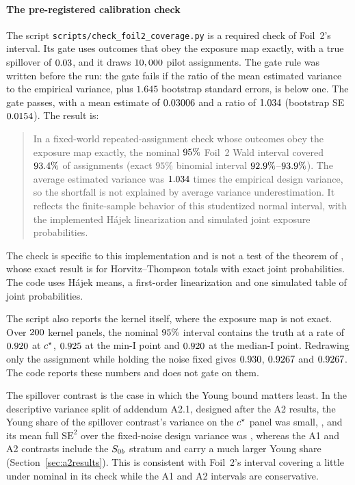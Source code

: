\paragraph{The pre-registered calibration check} The script
\texttt{scripts/check\_foil2\_coverage.py} is a required check of Foil~2's
interval. Its gate uses outcomes that obey the exposure map exactly, with a true
spillover of $0.03$, and it draws $10,000$ pilot assignments. The
gate rule was written before the run: the gate fails if the ratio of the mean
estimated variance to the empirical variance, plus $1.645$ bootstrap standard
errors, is below one. The gate passes, with a mean estimate of $0.03006$
and a ratio of $1.034$ (bootstrap SE $0.0154$). The result is:
\begin{quote}
In a fixed-world repeated-assignment check whose outcomes obey the exposure map
exactly, the nominal $95\%$ Foil~2 Wald interval covered
$93.4\%$ of assignments (exact $95\%$ binomial interval
$92.9\%$--$93.9\%$). The average estimated variance
was $1.034$ times the empirical design variance, so the shortfall is not
explained by average variance underestimation. It reflects the finite-sample
behavior of this studentized normal interval, with the implemented H\'ajek
linearization and simulated joint exposure probabilities.
\end{quote}
The check is specific to this implementation and is not a test of the theorem of
\citet{aronow2017}, whose exact result is for Horvitz--Thompson totals with exact
joint probabilities. The code uses H\'ajek means, a first-order linearization and
one simulated table of joint probabilities.

The script also reports the kernel itself, where the exposure map is not exact.
Over $200$ kernel panels, the nominal $95\%$ interval
contains the truth at a rate of $0.920$ at $c^\star$, $0.925$ at
the min-I point and $0.920$ at the median-I point. Redrawing only the
assignment while holding the noise fixed gives $0.930$, $0.9267$
and $0.9267$. The code reports these numbers and does not gate on them.

The spillover contrast is the case in which the Young bound matters least. In the
descriptive variance split of addendum A2.1, designed after the A2 results, the
Young share of the spillover contrast's variance on the $c^\star$ panel was small,
\YoungShareSpillStar, and its mean full $\mathrm{SE}^2$ over the fixed-noise
design variance was \DesignFullRatioSpillStar, whereas the A1 and A2 contrasts
include the $S_{0b}$ stratum and carry a much larger Young share
(Section~\ref{sec:a2results}). This is consistent with Foil~2's interval
covering a little under nominal in its check while the A1 and A2 intervals are
conservative.

